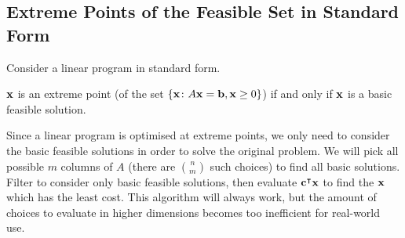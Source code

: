 \subsection{Extreme Points of the Feasible Set in Standard Form}
Consider a linear program in standard form.
\begin{theorem}
	\( \vb x \) is an extreme point (of the set \( \{ \vb x \colon A \vb x = \vb b, \vb x \geq 0 \} \)) if and only if \( \vb x \) is a basic feasible solution.
\end{theorem}
\begin{remark}
	Since a linear program is optimised at extreme points, we only need to consider the basic feasible solutions in order to solve the original problem.
	We will pick all possible \( m \) columns of \( A \) (there are \( \binom{n}{m} \) such choices) to find all basic solutions.
	Filter to consider only basic feasible solutions, then evaluate \( \vb c^\intercal \vb x \) to find the \( \vb x \) which has the least cost.
	This algorithm will always work, but the amount of choices to evaluate in higher dimensions becomes too inefficient for real-world use.
\end{remark}
